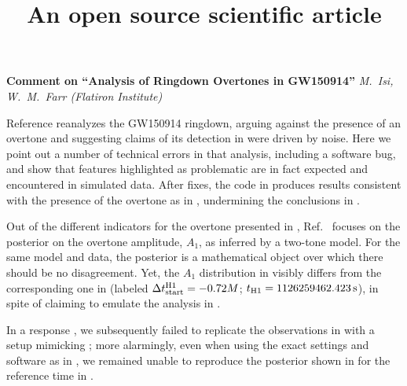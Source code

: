 \documentclass[aps,prd,twocolumn,superscriptaddress,preprintnumbers,floatfix,nofootinbib]{revtex4-2}
\begin{document}
\title{An open source scientific article}

\textbf{Comment on ``Analysis of Ringdown Overtones in GW150914''}
\emph{M.~Isi, W.~M.~Farr (Flatiron Institute)}

Reference \cite{Cotesta:2022pci} reanalyzes the GW150914 ringdown, arguing against the presence of an overtone and suggesting claims of its detection in \cite{Isi:2019aib} were driven by noise.
Here we point out a number of technical errors in that analysis, including a software bug, and show that features
highlighted as problematic are in fact expected and encountered in simulated data.
After fixes, the code in \cite{Cotesta:2022pci} produces results consistent with the presence of the overtone as in \cite{Isi:2019aib,Isi:2022mhy,Finch:2022ynt}, undermining the conclusions in \cite{Cotesta:2022pci}.

Out of the different indicators for the overtone presented in
\cite{Isi:2019aib}, Ref.~\cite{Cotesta:2022pci} focuses on the posterior on the
overtone amplitude, $A_1$, as inferred by a two-tone model. For the
same model and data, the posterior is a mathematical object over which there
should be no disagreement. Yet, the $A_1$ distribution in \cite{Isi:2019aib}
visibly differs from the corresponding one in \cite{Cotesta:2022pci} (labeled $\Delta
t_{\rm start}^{\rm H1} = -0.72M$; $t_{\rm H1} = 1126259462.423 \, \mathrm{s}$), in
spite of \cite{Cotesta:2022pci} claiming to emulate the analysis in
\cite{Isi:2019aib}.

In a response \cite{Isi:2022mhy}, we subsequently failed to replicate the observations in \cite{Cotesta:2022pci} with a setup mimicking \cite{Isi:2019aib}; more alarmingly, even when using the exact settings and software as in \cite{Cotesta:2022pci}, we remained unable to reproduce the posterior shown in \cite{Cotesta:2022pci} for the reference time in \cite{Isi:2019aib}.
\end{document}
